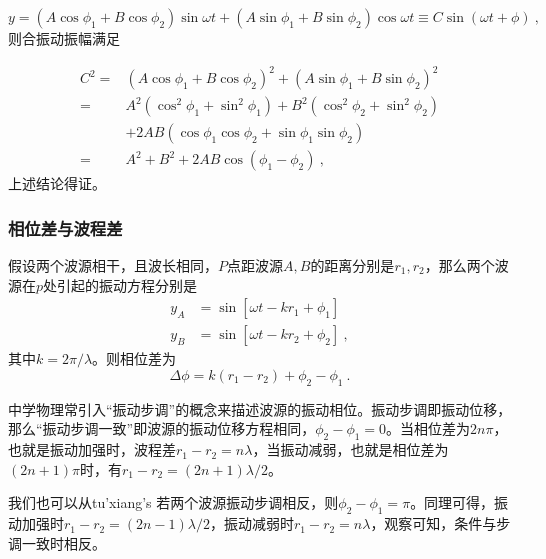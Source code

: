 \begin{equation}
y=\left(A \cos \phi_1+B \cos \phi_2\right) \sin \omega t+\left(A \sin \phi_1+B \sin \phi_2\right) \cos \omega t\equiv C\sin (\omega t+\phi)~,
\end{equation}
则合振动振幅满足

\begin{equation}\label{eq_mcwave_3}
\begin{aligned}
C^2
= & \left(A \cos \phi_1+B \cos \phi_2\right)^2+\left(A \sin \phi_1+B \sin \phi_2\right)^2 \\
= & A^2\left(\cos ^2 \phi_1+\sin ^2 \phi_1\right)+B^2\left(\cos ^2 \phi_2+\sin ^2 \phi_2\right) \\
& +2 A B\left(\cos \phi_1 \cos \phi_2+\sin \phi_1 \sin \phi_2\right) \\
= & A^2+B^2+2 A B \cos \left(\phi_1-\phi_2\right)~,
\end{aligned}
\end{equation}
上述结论得证。
\subsubsection{相位差与波程差}
假设两个波源相干，且波长相同，$P$点距波源$A,B$的距离分别是$r_1,r_2$，那么两个波源在$p$处引起的振动方程分别是
\begin{equation}
\begin{aligned}
y_A&=\sin[\omega t-kr_1+\phi_1]\\
y_B&=\sin[\omega t-kr_2+\phi_2]~,
\end{aligned}
\end{equation}
其中$k=2\pi/\lambda$。则相位差为
\begin{equation}
\Delta\phi=k(r_1-r_2)+\phi_2-\phi_1~.
\end{equation}

中学物理常引入“振动步调”的概念来描述波源的振动相位。振动步调即振动位移，那么“振动步调一致”即波源的振动位移方程相同，$\phi_2-\phi_1=0$。当相位差为$2n\pi$，也就是振动加强时，波程差$r_1-r_2=n\lambda$，当振动减弱，也就是相位差为$(2n+1)\pi$时，有$r_1-r_2=(2n+1)\lambda/2$。

我们也可以从tu'xiang's
若两个波源振动步调相反，则$\phi_2-\phi_1=\pi$。同理可得，振动加强时$r_1-r_2=(2n-1)\lambda/2$，振动减弱时$r_1-r_2=n\lambda$，观察可知，条件与步调一致时相反。


